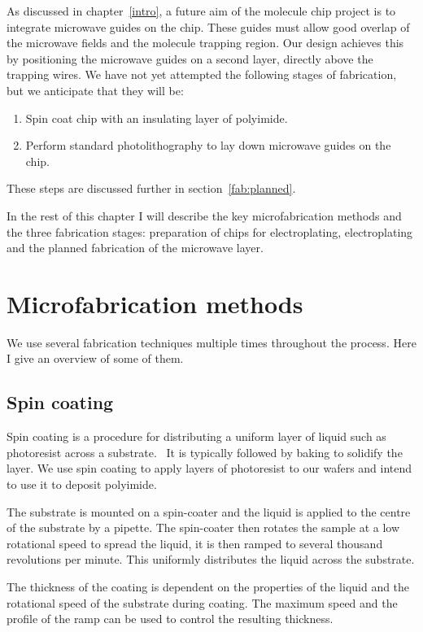 As discussed in chapter~\ref{intro}, a future aim of the molecule chip project is to
integrate microwave guides on the chip. These guides must allow good overlap of
the microwave fields and the molecule trapping region. Our design achieves this
by positioning the microwave guides on a second layer, directly above the
trapping wires. We have not yet attempted the following stages of
fabrication, but we anticipate that they will be:
\begin{enumerate}[resume]
    \item Spin coat chip with an insulating layer of polyimide.
    \item Perform standard photolithography to lay down microwave guides on the
      chip.
\end{enumerate}
These steps are discussed further in section~\ref{fab:planned}.

In the rest of this chapter I will describe the key microfabrication methods
and the three fabrication stages: preparation of chips for electroplating,
electroplating and the planned fabrication of the microwave layer.

\section{Microfabrication methods}

We use several fabrication techniques multiple times throughout the process.
Here I give an overview of some of them.

\subsection{Spin coating}
\label{fab:spin}

Spin coating is a procedure for distributing a uniform layer of liquid such as
photoresist  across a substrate.~\cite{Cohen2011} It is typically followed by
baking to solidify the layer. We use spin coating to apply layers of
photoresist to our wafers and intend to use it to deposit polyimide.

The substrate is mounted on a spin-coater
%
%
and the liquid is applied to the centre of the substrate by a pipette. The
spin-coater then rotates the sample at a low rotational speed to spread the
liquid, it is then ramped to several thousand revolutions per minute.
This uniformly distributes the liquid across the substrate.

The thickness of the coating is dependent on the properties of the liquid
 and the rotational speed of the substrate during coating.
The maximum speed and the profile of the ramp can be used to control the
resulting thickness.

